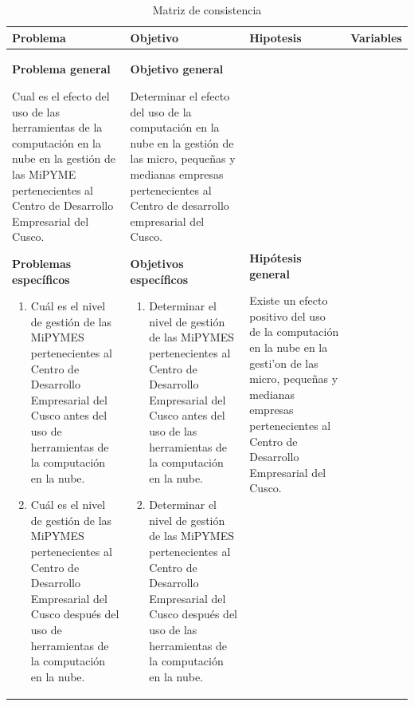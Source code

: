 \begin{table}
\centering
\caption{Matriz de consistencia}
\label{t:consistencia}
\begin{tabular}{|p{5cm}|p{5cm}|p{5cm}|p{4cm}|}
\hline
Problema & Objetivo & Hipotesis & Variables \\ \hline
\textbf{Problema general}

Cual es el efecto del uso de las herramientas de la computaci\'on en la nube
en la gesti\'on de las MiPYME pertenecientes al Centro de Desarrollo Empresarial
del Cusco.

\textbf{Problemas espec\'ificos}

\begin{enumerate}[noitemsep]
\item Cu\'al es el nivel de gesti\'on de las MiPYMES pertenecientes al Centro
de Desarrollo Empresarial del Cusco antes del uso de herramientas de la computaci\'on
en la nube.
\item Cu\'al es el nivel de gesti\'on de las MiPYMES pertenecientes al Centro
de Desarrollo Empresarial del Cusco despu\'es del uso de herramientas de la computaci\'on
en la nube.
\end{enumerate}
&
\textbf{Objetivo general}

Determinar el efecto del uso de la computaci\'on en la nube en la gesti\'on de
las micro, peque\~nas y medianas empresas pertenecientes al Centro de desarrollo
empresarial del Cusco.

\textbf{Objetivos espec\'ificos}
\begin{enumerate}
  \item Determinar el nivel de gesti\'on de las MiPYMES pertenecientes al Centro de
  Desarrollo Empresarial del Cusco antes del uso de las herramientas de la
  computaci\'on en la nube.
  \item Determinar el nivel de gesti\'on de las MiPYMES pertenecientes al Centro de
  Desarrollo Empresarial del Cusco despu\'es del uso de las herramientas de la
  computaci\'on en la nube.
\end{enumerate}
&
\textbf{Hip\'otesis general}

Existe un efecto positivo del uso de la computaci\'on en la nube en la
gesti'on de las micro, peque\~nas y medianas empresas pertenecientes al Centro de
Desarrollo Empresarial del Cusco.


\end{tabular}
\end{table}

